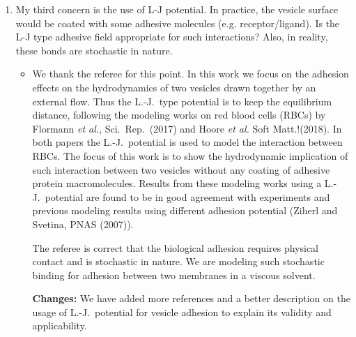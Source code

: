\documentclass[11pt]{article}
\newcommand{\comment}[1]{{\color{blue} #1}}
\begin{document}
\begin{enumerate}
\noindent
\item\comment{My third concern is the use of L-J potential. In practice, the
vesicle surface would be coated with some adhesive molecules (e.g.
receptor/ligand). Is the L-J type adhesive field appropriate for such
interactions? Also, in reality, these bonds are stochastic in nature.}
\begin{itemize}
  \item We thank the referee for this point.  In this work we focus on
    the adhesion effects on the hydrodynamics of two vesicles drawn
    together by an external flow.  Thus the L.-J.~type potential is to
    keep the equilibrium distance, following the modeling works on red
    blood cells (RBCs) by Flormann {\em et al.}, Sci.~Rep.~(2017) and
    Hoore {\em et al.} Soft Matt.!(2018).  In both papers the
    L.-J.~potential is used to model the interaction between RBCs. The
    focus of this work is to show the hydrodynamic implication of such
    interaction between two vesicles without any coating of adhesive
    protein macromolecules. Results from these modeling works using a
    L.-J.~potential are found to be in good agreement with experiments
    and previous modeling results using different adhesion potential
    (Ziherl and Svetina, PNAS (2007)).
  
    The referee is correct that the biological adhesion requires
    physical contact and is stochastic in nature. We are modeling such
    stochastic binding for adhesion between two membranes in a viscous
    solvent.
  
  \noindent
  {\bf Changes:} We have added more references and a better description
    on the usage of L.-J.~potential for vesicle adhesion to explain its
    validity and applicability.
  
\end{itemize}


\end{enumerate}
\end{document}
